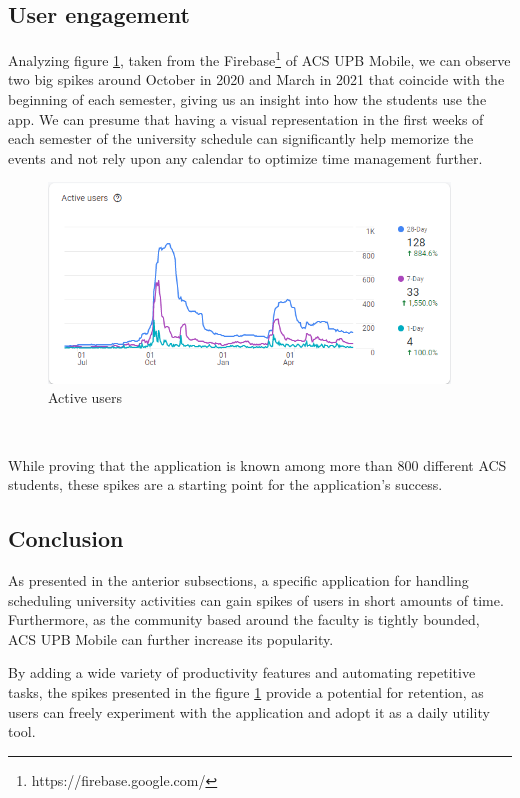 \subsection{User engagement} \label{3:specificapp_engament}
Analyzing figure \ref{3:fig:firebase}, taken from the Firebase\footnote{https://firebase.google.com/} of ACS UPB Mobile, we can observe two big spikes around October in 2020 and March in 2021 that coincide with the beginning of each semester, giving us an insight into how the students use the app. We can presume that having a visual representation in the first weeks of each semester of the university schedule can significantly help memorize the events and not rely upon any calendar to optimize time management further.
\begin{figure}[ht]
    \centering
         \includegraphics[width=0.95\textwidth]{figures/beforedev/image18.png}
    \caption{Active users} 
    \label{3:fig:firebase}
\end{figure}

~

While proving that the application is known among more than 800 different ACS students, these spikes are a starting point for the application’s success. 


\subsection{Conclusion} \label{3:specificapp_conclusion}
As presented in the anterior subsections, a specific application for handling scheduling university activities can gain spikes of users in short amounts of time. Furthermore, as the community based around the faculty is tightly bounded, ACS UPB Mobile can further increase its popularity. 

By adding a wide variety of productivity features and automating repetitive tasks, the spikes presented in the figure \ref{3:fig:firebase} provide a potential for retention, as users can freely experiment with the application and adopt it as a daily utility tool.

